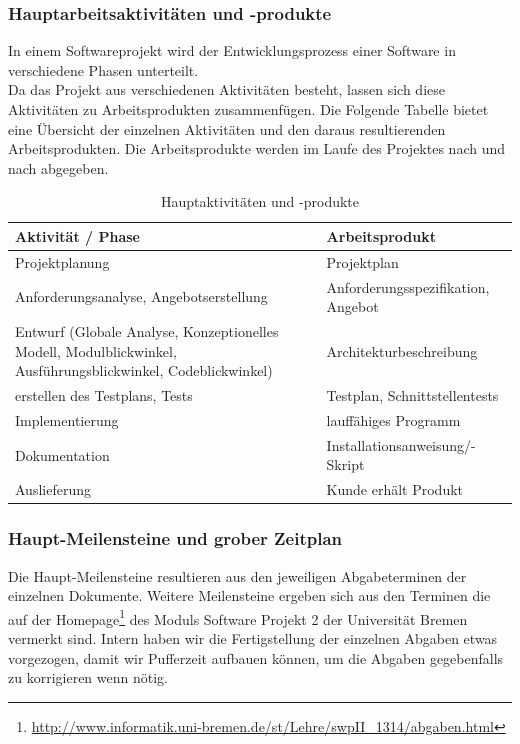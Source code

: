 \documentclass[fontsize=12pt,paper=a4,twoside]{scrartcl}
\begin{document}
\subsubsection{Hauptarbeitsaktivitäten und -produkte}

In einem Softwareprojekt wird der Entwicklungsprozess einer Software in verschiedene Phasen unterteilt.\\
Da das Projekt aus verschiedenen Aktivitäten besteht, lassen sich diese Aktivitäten zu Arbeitsprodukten zusammenfügen. Die Folgende Tabelle bietet eine Übersicht der einzelnen Aktivitäten und den daraus resultierenden Arbeitsprodukten. Die Arbeitsprodukte werden im Laufe des Projektes nach und nach abgegeben.\\

\begin{table}[htbp]
\caption{Hauptaktivitäten und -produkte}
\centering
\begin{tabular}{p{7cm}|p{7cm}}
\hline Aktivität / Phase & Arbeitsprodukt \\ \hline
\hline Projektplanung & Projektplan\\
\hline Anforderungsanalyse, Angebotserstellung & Anforderungsspezifikation, Angebot\\
\hline Entwurf (Globale Analyse, Konzeptionelles Modell, Modulblickwinkel, Ausführungsblickwinkel, Codeblickwinkel) & Architekturbeschreibung\\
\hline erstellen des Testplans, Tests & Testplan, Schnittstellentests\\
\hline Implementierung & lauffähiges Programm\\
\hline Dokumentation & Installationsanweisung/-Skript\\
\hline Auslieferung & Kunde erhält Produkt\\
\hline 
\end{tabular}
\end{table}

\newpage

\subsubsection{Haupt-Meilensteine und grober Zeitplan}

Die Haupt-Meilensteine resultieren aus den jeweiligen Abgabeterminen der einzelnen Dokumente. Weitere Meilensteine ergeben sich aus den Terminen die auf der Homepage\footnote{\url{http://www.informatik.uni-bremen.de/st/Lehre/swpII_1314/abgaben.html}} des Moduls Software Projekt 2 der Universität Bremen vermerkt sind. Intern haben wir die Fertigstellung der einzelnen Abgaben etwas vorgezogen, damit wir Pufferzeit aufbauen können, um die Abgaben gegebenfalls zu korrigieren wenn nötig.
\end{document}
